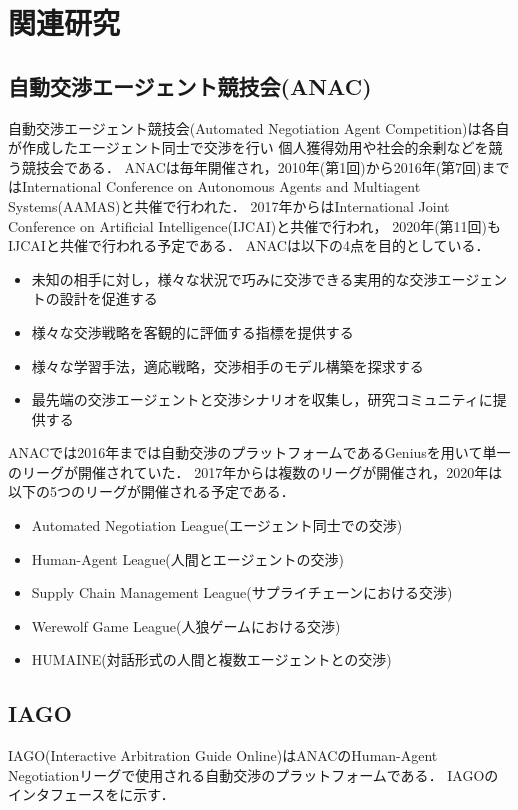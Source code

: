 

\chapter{関連研究}
\section{自動交渉エージェント競技会(ANAC)}

自動交渉エージェント競技会(Automated Negotiation Agent Competition)は各自が作成したエージェント同士で交渉を行い
個人獲得効用や社会的余剰などを競う競技会である\cite{anac2010-2017,anac2018,anac2019,anac2020}．
ANACは毎年開催され，2010年(第1回)から2016年(第7回)まではInternational Conference on Autonomous Agents and Multiagent Systems(AAMAS)と共催で行われた．
2017年からはInternational Joint Conference on Artificial Intelligence(IJCAI)と共催で行われ，
2020年(第11回)もIJCAIと共催で行われる予定である．
ANACは以下の4点を目的としている．

\begin{itemize}
    \item 未知の相手に対し，様々な状況で巧みに交渉できる実用的な交渉エージェントの設計を促進する
    \item 様々な交渉戦略を客観的に評価する指標を提供する
    \item 様々な学習手法，適応戦略，交渉相手のモデル構築を探求する
    \item 最先端の交渉エージェントと交渉シナリオを収集し，研究コミュニティに提供する
\end{itemize}

ANACでは2016年までは自動交渉のプラットフォームであるGeniusを用いて単一のリーグが開催されていた．
2017年からは複数のリーグが開催され，2020年は以下の5つのリーグが開催される予定である．

\begin{itemize}
    \item Automated Negotiation League(エージェント同士での交渉)
    \item Human-Agent League(人間とエージェントの交渉)
    \item Supply Chain Management League(サプライチェーンにおける交渉)
    \item Werewolf Game League(人狼ゲームにおける交渉)
    \item HUMAINE(対話形式の人間と複数エージェントとの交渉)
\end{itemize}

\section{IAGO}
IAGO(Interactive Arbitration Guide Online)はANACのHuman-Agent Negotiationリーグで使用される自動交渉のプラットフォームである\cite{iago}．
IAGOのインタフェースをに示す．


